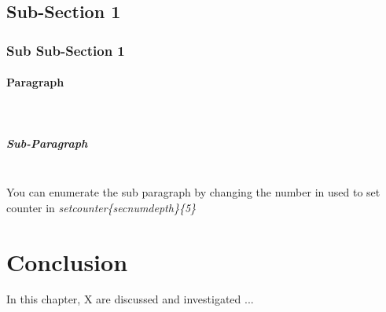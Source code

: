 \subsection{Sub-Section 1}

\subsubsection{Sub Sub-Section 1}

\paragraph{Paragraph} \mbox{}\\

\subparagraph{Sub-Paragraph} \mbox{}\\

You can enumerate the sub paragraph by changing the number in used to set counter in \textit{setcounter\{secnumdepth\}\{5\}}


\section{Conclusion}

In this chapter, X are discussed and investigated ...